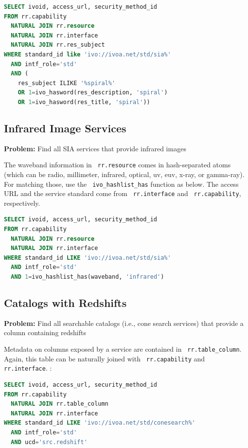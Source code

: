 \documentclass[11pt,a4paper]{ivoa}
\newcommand{\rtent}[1]{\texttt{\color{rtcolor} #1}}
\begin{document}
\begin{lstlisting}[language=SQL,flexiblecolumns=true]
SELECT ivoid, access_url, security_method_id
FROM rr.capability 
  NATURAL JOIN rr.resource
  NATURAL JOIN rr.interface
  NATURAL JOIN rr.res_subject
WHERE standard_id like 'ivo://ivoa.net/std/sia%'
  AND intf_role='std'
  AND (
    res_subject ILIKE '%spiral%'
    OR 1=ivo_hasword(res_description, 'spiral')
    OR 1=ivo_hasword(res_title, 'spiral'))
\end{lstlisting}


\subsection{Infrared Image Services}

\textbf{Problem:} Find all SIA services that provide infrared
images

The waveband information in 
\rtent{rr.resource} 
comes in hash-separated atoms (which can be
radio, millimeter, infrared, optical, uv, euv, x-ray, or gamma-ray).
For matching those, use the \rtent{ivo\_hashlist\_has} function as
below.  The access URL and the service standard come from 
\rtent{rr.interface} and 
\rtent{rr.capability}, respectively.


\begin{lstlisting}[language=SQL,flexiblecolumns=true]
SELECT ivoid, access_url, security_method_id
FROM rr.capability 
  NATURAL JOIN rr.resource
  NATURAL JOIN rr.interface
WHERE standard_id LIKE 'ivo://ivoa.net/std/sia%'
  AND intf_role='std'
  AND 1=ivo_hashlist_has(waveband, 'infrared')
\end{lstlisting}

\subsection{Catalogs with Redshifts}
\textbf{Problem:} Find all searchable catalogs (i.e., cone search
services) that provide a column containing redshifts

Metadata on columns exposed by a service are contained in 
\rtent{rr.table\_column}.  Again, this table can be
naturally joined with 
\rtent{rr.capability} and 
\rtent{rr.interface}.
:
\begin{lstlisting}[language=SQL,flexiblecolumns=true]
SELECT ivoid, access_url, security_method_id
FROM rr.capability 
  NATURAL JOIN rr.table_column
  NATURAL JOIN rr.interface 
WHERE standard_id LIKE 'ivo://ivoa.net/std/conesearch%'
  AND intf_role='std'
  AND ucd='src.redshift'
\end{lstlisting}
\end{document}
